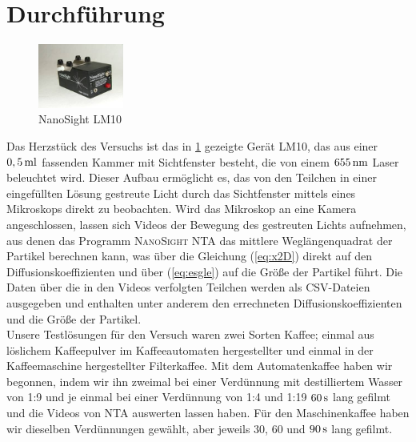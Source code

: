 \documentclass[numbers=noenddot,12pt,a4paper]{scrartcl}
\begin{document}
\section{Durchführung}\label{kap:durchf}
\begin{figure}
	\vspace{-15pt}
	\includegraphics[width=0.25\textwidth]{Kammer}
	\caption{NanoSight LM10}\label{img:LM10}
	\vspace{-15pt}
\end{figure}
Das Herzstück des Versuchs ist das in \ref{img:LM10} gezeigte Gerät \textsc{LM10}, das aus einer $\unit[0,5]{ml}$ fassenden Kammer mit Sichtfenster besteht, die von einem $\unit[655]{nm}$ Laser beleuchtet wird. Dieser Aufbau ermöglicht es, das von den Teilchen in einer eingefüllten Lösung gestreute Licht durch das Sichtfenster mittels eines Mikroskops direkt zu beobachten. Wird das Mikroskop an eine Kamera angeschlossen, lassen sich Videos der Bewegung des gestreuten Lichts aufnehmen, aus denen das Programm \textsc{NanoSight NTA} das mittlere Weglängenquadrat der Partikel berechnen kann, was über die Gleichung (\ref{eq:x2D}) direkt auf den Diffusionskoeffizienten und über (\ref{eq:esgle}) auf die Größe der Partikel führt. Die Daten über die in den Videos verfolgten Teilchen werden als CSV-Dateien ausgegeben und enthalten unter anderem den errechneten Diffusionskoeffizienten und die Größe der Partikel.\\
Unsere Testlösungen für den Versuch waren zwei Sorten Kaffee; einmal aus löslichem Kaffeepulver im Kaffeeautomaten hergestellter und einmal in der Kaffeemaschine hergestellter Filterkaffee. Mit dem Automatenkaffee haben wir begonnen, indem wir ihn zweimal bei einer Verdünnung mit destilliertem Wasser von 1:9 und je einmal bei einer Verdünnung von 1:4 und 1:19 $\unit[60]{s}$ lang gefilmt und die Videos von \textsc{NTA} auswerten lassen haben. Für den Maschinenkaffee haben wir dieselben Verdünnungen gewählt, aber jeweils $30$, $60$ und $\unit[90]{s}$ lang gefilmt.
\end{document}
